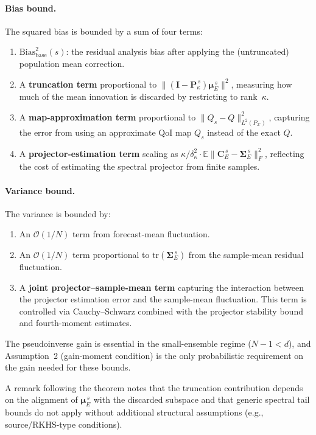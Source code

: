 \documentclass[11pt]{article}
\begin{document}
\paragraph{Bias bound.} The squared bias is bounded by a sum of four terms:
\begin{enumerate}
  \item $\mathrm{Bias}_{\mathrm{base}}^2(s)$: the residual analysis bias after
    applying the (untruncated) population mean correction.
  \item A \textbf{truncation term} proportional to
    $\|(\mathbf{I} - \mathbf{P}_\kappa^{\,s})\boldsymbol{\mu}_E^{\,s}\|^2$,
    measuring how much of the mean innovation is discarded by restricting to
    rank~$\kappa$.
  \item A \textbf{map-approximation term} proportional to
    $\|Q_s - Q\|_{L^2(P_{\mathcal{X}})}^2$, capturing the error from using an
    approximate QoI map $Q_s$ instead of the exact $Q$.
  \item A \textbf{projector-estimation term} scaling as
    $\kappa / \delta_\kappa^2 \cdot \mathbb{E}\|\mathbf{C}_E^{\,s} -
      \boldsymbol{\Sigma}_E^{\,s}\|_F^2$,
    reflecting the cost of estimating the spectral projector from finite samples.
\end{enumerate}

\paragraph{Variance bound.} The variance is bounded by:
\begin{enumerate}
  \item An $\mathcal{O}(1/N)$ term from forecast-mean fluctuation.
  \item An $\mathcal{O}(1/N)$ term proportional to
    $\mathrm{tr}(\boldsymbol{\Sigma}_E^{\,s})$ from the sample-mean residual
    fluctuation.
  \item A \textbf{joint projector--sample-mean term} capturing the interaction
    between the projector estimation error and the sample-mean fluctuation.
    This term is controlled via Cauchy--Schwarz combined with the projector
    stability bound and fourth-moment estimates.
\end{enumerate}

\noindent
The pseudoinverse gain is essential in the small-ensemble regime ($N - 1 < d$),
and Assumption~2 (gain-moment condition) is the only probabilistic requirement
on the gain needed for these bounds.

A remark following the theorem notes that the truncation contribution depends on
the alignment of $\boldsymbol{\mu}_E^{\,s}$ with the discarded subspace and
that generic spectral tail bounds do not apply without additional structural
assumptions (e.g., source/RKHS-type conditions).
\end{document}
